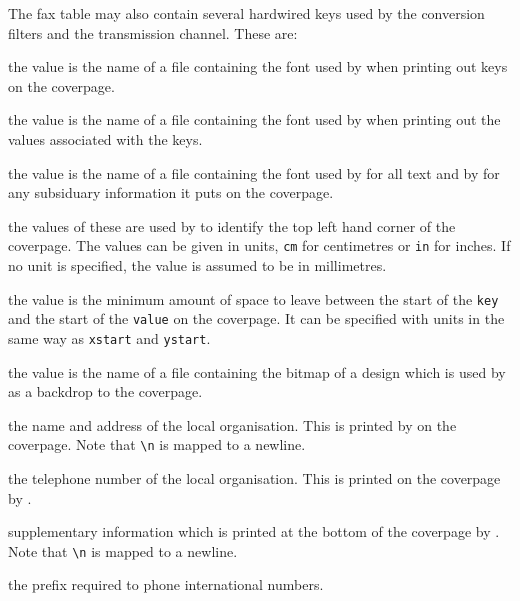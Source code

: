 The fax table may also contain several hardwired keys used by the
conversion filters and the transmission channel.
These are:
\begin{describe}
\item[\verb+keyfont+:] the value is the name of a file containing the
font used by  when printing out keys on the coverpage.

\item[\verb+valuefont+:] the value is the name of a file containing
the font used by  when printing out the values
associated with the keys.

\item[\verb+textfont+:] the value is the name of a file containing the
font used by  for all text and by  for any
subsiduary information it puts on the coverpage.

\item[\verb+xstart+:]
\item[\verb+ystart+:] the values of these are used by  to
identify the top left hand corner of the coverpage.
The values can be given in units, \verb+cm+ for centimetres or
\verb+in+ for inches.
If no unit is specified, the value is assumed to be in millimetres.

\item[\verb+tab+:] the value is the minimum amount of space to leave
between the start of the \verb+key+ and the start of the \verb+value+
on the coverpage. It can be specified with units in the same way as
\verb+xstart+ and \verb+ystart+.

\item[\verb+coverpage+:] the value is the name of a file containing
the bitmap of a design which is used by  as a backdrop to
the coverpage.

\item[\verb+localOrg+:] the name and address of the local
organisation.
This is printed by  on the coverpage.
Note that \verb+\n+ is mapped to a newline.

\item[\verb+localNumber+:] the telephone number of the local
organisation.
This is printed on the coverpage by .

\item[\verb+postscript+:] supplementary information which is printed
at the bottom of the coverpage by .
Note that \verb+\n+ is mapped to a newline.

\item[\verb+int\_prefix+] the prefix required to phone international
numbers.

\end{describe}

